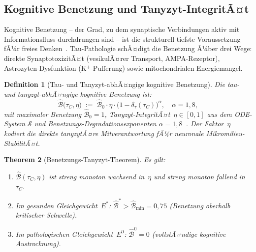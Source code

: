 ﻿\documentclass[12pt,a4paper]{article}
\newtheorem{theorem}{Theorem}[section]
\newtheorem{definition}[theorem]{Definition}
\theoremstyle{definition}
\begin{document}
	\subsection{Kognitive Benetzung und Tanyzyt-IntegritÃ¤t}

	Kognitive Benetzung -- der Grad, zu dem synaptische Verbindungen aktiv mit
	Informationsfluss durchdrungen sind -- ist die strukturell tiefste Voraussetzung fÃ¼r
	freies Denken~\cite{Epp2026brn}. Tau-Pathologie schÃ¤digt die Benetzung Ã¼ber drei Wege:
	direkte SynaptotoxizitÃ¤t (vesikulÃ¤rer Transport, AMPA-Rezeptor), Astrozyten-Dysfunktion
	(K$^+$-Pufferung) sowie mitochondrialen Energiemangel.

	\begin{definition}[Tau- und Tanyzyt-abhÃ¤ngige kognitive Benetzung]
		\label{def:nass_tany}
		Die \emph{tau- und tanyzyt-abhÃ¤ngige kognitive Benetzung} ist:
		\[
			\hat{\mathcal{B}}\bigl(\tau_C, \eta\bigr)
			\;:=\;
			\hat{\mathcal{B}}_0 \cdot \eta \cdot
			\bigl(1 - \delta_\tau(\tau_C)\bigr)^{\!\alpha},
			\quad \alpha = 1{,}8,
		\]
		mit maximaler Benetzung $\hat{\mathcal{B}}_0 = 1$, Tanyzyt-IntegritÃ¤t~$\eta \in [0,1]$
		aus dem ODE-System $\mathcal{S}$ und Benetzungs-Degradationsexponenten
		$\alpha = 1{,}8$~\cite{Epp2026brn}. Der Faktor~$\eta$ kodiert die direkte
		tanyzytÃ¤re Mitverantwortung fÃ¼r neuronale Mikromilieu-StabilitÃ¤t.
	\end{definition}

	\begin{theorem}[Benetzungs-Tanyzyt-Theorem]
		\label{thm:benet_tany}
		Es gilt:
		\begin{enumerate}[label=(\roman*)]
			\item $\hat{\mathcal{B}}(\tau_C, \eta)$ ist streng monoton wachsend in~$\eta$
			      und streng monoton fallend in~$\tau_C$.
			\item Im gesunden Gleichgewicht~$E^*$: $\hat{\mathcal{B}}^* > \hat{\mathcal{B}}_{\min} = 0{,}75$
			      (Benetzung oberhalb kritischer Schwelle).
			\item Im pathologischen Gleichgewicht~$E^0$: $\hat{\mathcal{B}}^0 = 0$
			      (vollstÃ¤ndige kognitive Austrocknung).
		\end{enumerate}
	\end{theorem}
\end{document}

